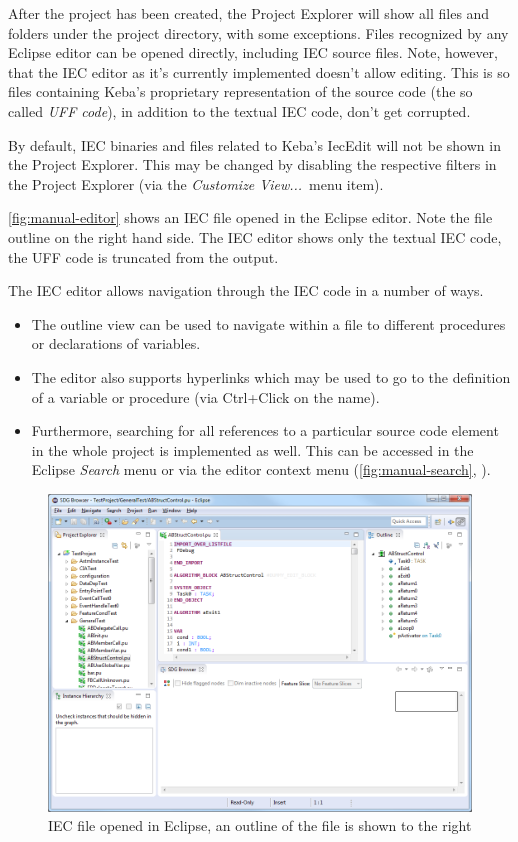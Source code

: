 After the project has been created, the Project Explorer will show all files and folders under the project directory, 
with some exceptions. Files recognized by any Eclipse editor can be opened directly, including IEC source files. Note, 
however, that the IEC editor as it's currently implemented doesn't allow editing. This is so files containing Keba's 
proprietary representation of the source code (the so called \emph{UFF code}), in addition to the textual IEC code, 
don't get corrupted.

By default, IEC binaries and files related to Keba's IecEdit will not be shown in the Project Explorer. This may be 
changed by disabling the respective filters in the Project Explorer (via the \emph{Customize View...}\ menu item).

\autoref{fig:manual-editor} shows an IEC file opened in the Eclipse editor. Note the file outline on the right hand 
side. The IEC editor shows only the textual IEC code, the UFF code is truncated from the output.

The IEC editor allows navigation through the IEC code in a number of ways.

\begin{itemize}
  \item The outline view can be used to navigate within a file to different procedures or declarations of variables.
  
  \item The editor also supports hyperlinks which may be used to go to the definition of a variable or procedure (via 
  Ctrl+Click on the name).
  
  \item Furthermore, searching for all references to a particular source code element in the whole project is 
  implemented as well. This can be accessed in the Eclipse \emph{Search} menu or via the editor context menu 
  (\autoref{fig:manual-search}, ).
\end{itemize}

\begin{figure}[hp]
  \centering
    \includegraphics[width=\textwidth]{bilder/manual-editor}
  \caption{IEC file opened in Eclipse, an outline of the file is shown to the right}
  \label{fig:manual-editor}
\end{figure}


